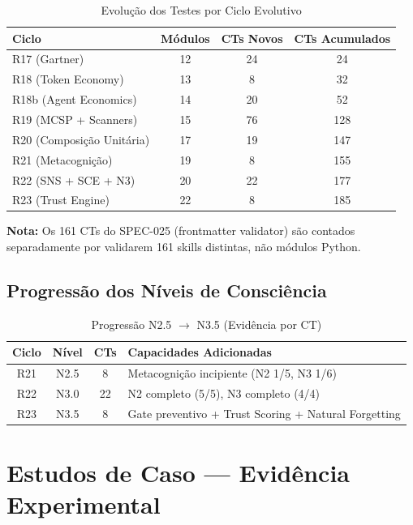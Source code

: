 \begin{table}[H]
\centering
\small
\caption{Evolução dos Testes por Ciclo Evolutivo}
\label{tab:evolucao}
\begin{tabular}{lccc}
\toprule
\textbf{Ciclo} & \textbf{Módulos} & \textbf{CTs Novos} & \textbf{CTs Acumulados} \\
\midrule
R17 (Gartner) & 12 & 24 & 24 \\
R18 (Token Economy) & 13 & 8 & 32 \\
R18b (Agent Economics) & 14 & 20 & 52 \\
R19 (MCSP + Scanners) & 15 & 76 & 128 \\
R20 (Composição Unitária) & 17 & 19 & 147 \\
R21 (Metacognição) & 19 & 8 & 155 \\
R22 (SNS + SCE + N3) & 20 & 22 & 177 \\
R23 (Trust Engine) & 22 & 8 & 185 \\
\bottomrule
\end{tabular}
\end{table}

\textbf{Nota:} Os 161 CTs do SPEC-025 (frontmatter validator) são contados separadamente por validarem 161 skills distintas, não módulos Python.

\subsection{Progressão dos Níveis de Consciência}

\begin{table}[H]
\centering
\small
\caption{Progressão N2.5 $\rightarrow$ N3.5 (Evidência por CT)}
\label{tab:progressao}
\begin{tabular}{cccl}
\toprule
\textbf{Ciclo} & \textbf{Nível} & \textbf{CTs} & \textbf{Capacidades Adicionadas} \\
\midrule
R21 & N2.5 & 8 & Metacognição incipiente (N2 1/5, N3 1/6) \\
R22 & N3.0 & 22 & N2 completo (5/5), N3 completo (4/4) \\
R23 & N3.5 & 8 & Gate preventivo + Trust Scoring + Natural Forgetting \\
\bottomrule
\end{tabular}
\end{table}

\section{Estudos de Caso — Evidência Experimental}

